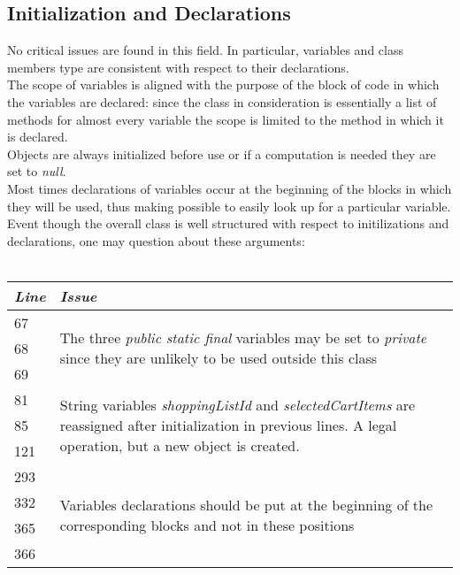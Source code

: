 \documentclass[11pt,a4paper]{report}
\begin{document}
\subsection{Initialization and Declarations}
No critical issues are found in this field. In particular, variables and class members type are consistent with respect to their declarations.\\The scope of variables is aligned with the purpose of the block of code in which the variables are declared: since the class in consideration is essentially a list of methods for almost every variable the scope is limited to the method in which it is declared.\\Objects are always initialized before use or if a computation is needed they are set to \textit{null}.\\Most times declarations of variables occur at the beginning of the blocks in which they will be used, thus making possible to easily look up for a particular variable.\\
Event though the overall class is well structured with respect to initilizations and declarations, one may question about these arguments:
\\\\
\begin{tabularx}{\textwidth}{|l|X|}
	\hline
	\textit{Line} & \textit{Issue}\\
	\hline
	67 & \multirow{3}{\linewidth}{The three \textit{public static final} variables may be set to \textit{private} since they are unlikely to be used outside this class}\\
	68 & \\
	69 & \\
	\hline
	\hline
	81 & \multirow{3}{\linewidth}{String variables \textit{shoppingListId} and \textit{selectedCartItems} are reassigned after initialization in previous lines. A legal operation, but a new object is created.}\\
	85 & \\
	121 & \\
	\hline
	\hline
	293 & \multirow{4}{\linewidth}{Variables declarations should be put at the beginning of the corresponding blocks and not in these positions}\\
	332 & \\
	365 & \\
	366 & \\
	\hline
\end{tabularx}
\\\\
\end{document}
